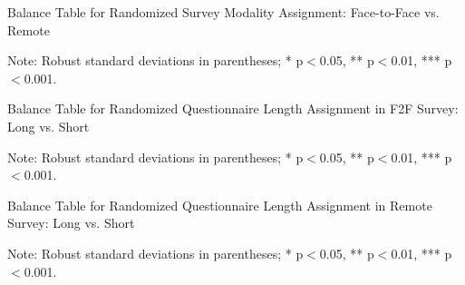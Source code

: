 \documentclass[11pt,harvard]{article}
\begin{document}
	\begin{table}[htbp]
		\centering
		\begin{adjustbox}{max width=\textwidth}
			\begin{threeparttable}
				\caption{Balance Table for Randomized Survey Modality Assignment: Face-to-Face vs. Remote}
				\small
				 
				\label{tab:BF_Listing_Demo_Balance_Modality}
				\begin{tablenotes}
					\item Note: Robust standard deviations in parentheses; * p$<$0.05, ** p$<$0.01, *** p$<$0.001. 
				\end{tablenotes}
			\end{threeparttable}
		\end{adjustbox}
	\end{table}
	
	
	
	\begin{table}[htbp]
		\centering
		\begin{adjustbox}{max width=\textwidth}
			\begin{threeparttable}
				\caption{Balance Table for Randomized Questionnaire Length Assignment in F2F Survey: Long vs. Short}
				\small
				 
				\label{tab:BF_Listing_Demo_Balance_F2F_Length}
				\begin{tablenotes}
					\item Note: Robust standard deviations in parentheses; * p$<$0.05, ** p$<$0.01, *** p$<$0.001.
				\end{tablenotes}
			\end{threeparttable}
		\end{adjustbox}
	\end{table}
	
	
	\begin{table}[htbp]
		\centering
		\begin{adjustbox}{max width=\textwidth}
			\begin{threeparttable}
				\caption{Balance Table for Randomized Questionnaire Length Assignment in Remote Survey: Long vs. Short}
				\small
				 
				\label{tab:BF_Listing_Demo_Balance_RM_Length}
				\begin{tablenotes}
					\item Note: Robust standard deviations in parentheses; * p$<$0.05, ** p$<$0.01, *** p$<$0.001.
				\end{tablenotes}
			\end{threeparttable}
		\end{adjustbox}
	\end{table}
	
\end{document}
